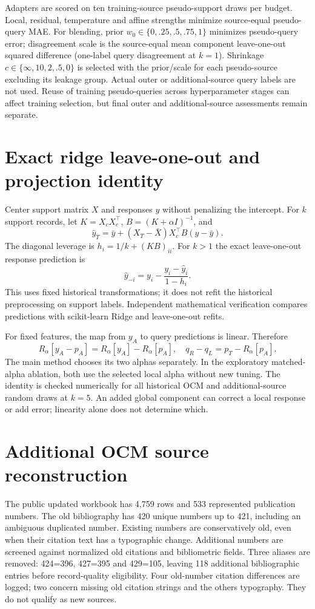 \documentclass[11pt]{article}
\begin{document}
Adapters are scored on ten training-source pseudo-support draws per budget. Local, residual, temperature and affine strengths minimize source-equal pseudo-query MAE. For blending, prior $w_0\in\{0,.25,.5,.75,1\}$ minimizes pseudo-query error; disagreement scale is the source-equal mean component leave-one-out squared difference (one-label query disagreement at $k=1$). Shrinkage $c\in\{\infty,10,2,.5,0\}$ is selected with the prior/scale for each pseudo-source excluding its leakage group. Actual outer or additional-source query labels are not used. Reuse of training pseudo-queries across hyperparameter stages can affect training selection, but final outer and additional-source assessments remain separate.

\section{Exact ridge leave-one-out and projection identity}
Center support matrix $X$ and responses $y$ without penalizing the intercept. For $k$ support records, let $K=X_cX_c^\top$, $B=(K+\alpha I)^{-1}$, and
\[\widehat y_T=\bar y+(X_T-\bar X)X_c^\top B(y-\bar y).\]
The diagonal leverage is $h_i=1/k+(KB)_{ii}$. For $k>1$ the exact leave-one-out response prediction is
\[\widehat y_{-i}=y_i-\frac{y_i-\widehat y_i}{1-h_i}.\]
This uses fixed historical transformations; it does not refit the historical preprocessing on support labels. Independent mathematical verification compares predictions with scikit-learn Ridge and leave-one-out refits.

For fixed features, the map from $y_A$ to query predictions is linear. Therefore
\[R_\alpha[y_A-p_A]=R_\alpha[y_A]-R_\alpha[p_A],\quad q_R-q_L=p_T-R_\alpha[p_A].\]
The main method chooses its two alphas separately. In the exploratory matched-alpha ablation, both use the selected local alpha without new tuning. The identity is checked numerically for all historical OCM and additional-source random draws at $k=5$. An added global component can correct a local response or add error; linearity alone does not determine which.

\section{Additional OCM source reconstruction}
The public updated workbook has 4,759 rows and 533 represented publication numbers. The old bibliography has 420 unique numbers up to 421, including an ambiguous duplicated number. Existing numbers are conservatively old, even when their citation text has a typographic change. Additional numbers are screened against normalized old citations and bibliometric fields. Three aliases are removed: 424=396, 427=395 and 429=105, leaving 118 additional bibliographic entries before record-quality eligibility. Four old-number citation differences are logged; two concern missing old citation strings and the others typography. They do not qualify as new sources.
\end{document}
